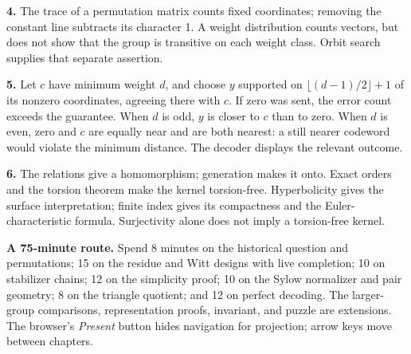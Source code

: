 \documentclass[12pt,letterpaper]{article}
\theoremstyle{definition}
\theoremstyle{remark}
\begin{document}
\textbf{4.} The trace of a permutation matrix counts fixed coordinates; removing the constant line subtracts its character 1. A weight distribution counts vectors, but does not show that the group is transitive on each weight class. Orbit search supplies that separate assertion.

\textbf{5.} Let $c$ have minimum weight $d$, and choose $y$ supported on $\lfloor(d-1)/2\rfloor+1$ of its nonzero coordinates, agreeing there with $c$. If zero was sent, the error count exceeds the guarantee. When $d$ is odd, $y$ is closer to $c$ than to zero. When $d$ is even, zero and $c$ are equally near and are both nearest: a still nearer codeword would violate the minimum distance. The decoder displays the relevant outcome.

\textbf{6.} The relations give a homomorphism; generation makes it onto. Exact orders and the torsion theorem make the kernel torsion-free. Hyperbolicity gives the surface interpretation; finite index gives its compactness and the Euler-characteristic formula. Surjectivity alone does not imply a torsion-free kernel.

\textbf{A 75-minute route.} Spend 8 minutes on the historical question and permutations; 15 on the residue and Witt designs with live completion; 10 on stabilizer chains; 12 on the simplicity proof; 10 on the Sylow normalizer and pair geometry; 8 on the triangle quotient; and 12 on perfect decoding. The larger-group comparisons, representation proofs, invariant, and puzzle are extensions. The browser's \emph{Present} button hides navigation for projection; arrow keys move between chapters.
\end{document}
